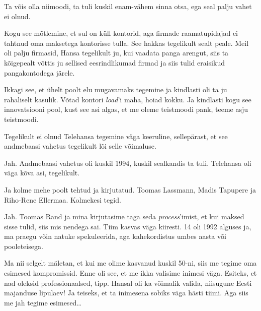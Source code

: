 Ta võis olla niimoodi, ta tuli kuskil enam-vähem sinna otsa, ega seal palju 
vahet ei olnud. 


Kogu see mõtlemine, et sul on küll kontorid, aga firmade raamatupidajad ei 
tahtnud oma maksetega kontorisse tulla. See hakkas tegelikult sealt peale. Meil 
oli palju firmasid, Hansa tegelikult ju, kui vaadata panga  arengut, siis ta  
kõigepealt võttis ju sellised eesrindlikumad firmad ja siis tulid eraisikud 
pangakontodega järele. 

Ikkagi see, et ühelt poolt elu mugavamaks tegemine ja kindlasti oli ta ju 
rahaliselt kasulik. Võtad kontori \emph{load}'i maha, hoiad kokku. Ja kindlasti 
kogu see innovatsiooni pool, kust see asi algas, et me oleme teistmoodi pank, 
teeme asju teistmoodi. 


Tegelikult ei olnud Telehansa tegemine väga keeruline, sellepärast, et see 
andmebaasi vahetus tegelikult lõi selle võimaluse. 


Jah. Andmebaasi vahetus oli  kuskil 1994, kuskil sealkandis ta tuli. Telehansa 
oli väga kõva asi, tegelikult.


Ja kolme mehe poolt tehtud ja kirjutatud. Toomas Lassmann, Madis Tapupere ja Riho-Rene 
Ellermaa. Kolmekesi tegid. 


Jah. Toomas Rand ja mina  kirjutasime taga seda \emph{process}'imist, et kui 
maksed sisse tulid, siis mis nendega sai. Tiim kasvas väga kiiresti. 14 oli 
1992 alguses ja, ma praegu võin natuke spekuleerida, aga kahekordistus umbes 
aasta või pooleteisega. 


Ma nii selgelt mäletan, et kui me olime kasvanud kuskil 50-ni, siis me tegime 
oma esimesed kompromissid. Enne oli see, et me ikka valisime inimesi väga. 
Esiteks, et nad oleksid professionaalsed, tipp. Hansal oli ka võimalik valida, 
niisugune Eesti majanduse lipulaev! Ja teiseks, et ta inimesena sobiks väga 
hästi tiimi. Aga siis me jah tegime esimesed\ldots

